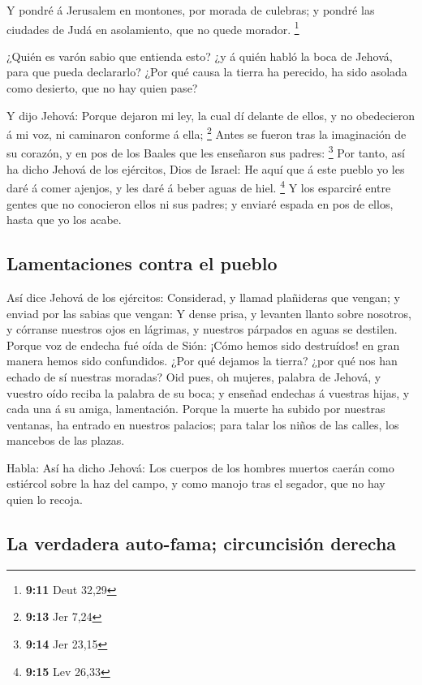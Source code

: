  Y pondré á Jerusalem en montones, por morada de
culebras; y pondré las ciudades de Judá en asolamiento, que no quede
morador. \footnote{\textbf{9:11} Deut 32,29}

 ¿Quién es varón sabio que entienda esto? ¿y á quién
habló la boca de Jehová, para que pueda declararlo? ¿Por qué causa la
tierra ha perecido, ha sido asolada como desierto, que no hay quien
pase?

 Y dijo Jehová: Porque dejaron mi ley, la cual dí delante
de ellos, y no obedecieron á mi voz, ni caminaron conforme á ella;
\footnote{\textbf{9:13} Jer 7,24}  Antes se fueron tras
la imaginación de su corazón, y en pos de los Baales que les enseñaron
sus padres: \footnote{\textbf{9:14} Jer 23,15}  Por
tanto, así ha dicho Jehová de los ejércitos, Dios de Israel: He aquí que
á este pueblo yo les daré á comer ajenjos, y les daré á beber aguas de
hiel. \footnote{\textbf{9:15} Lev 26,33}  Y los esparciré
entre gentes que no conocieron ellos ni sus padres; y enviaré espada en
pos de ellos, hasta que yo los acabe.

\hypertarget{lamentaciones-contra-el-pueblo}{%
\subsection{Lamentaciones contra el
pueblo}\label{lamentaciones-contra-el-pueblo}}

 Así dice Jehová de los ejércitos: Considerad, y llamad
plañideras que vengan; y enviad por las sabias que vengan:
 Y dense prisa, y levanten llanto sobre nosotros, y
córranse nuestros ojos en lágrimas, y nuestros párpados en aguas se
destilen.  Porque voz de endecha fué oída de Sión: ¡Cómo
hemos sido destruídos! en gran manera hemos sido confundidos. ¿Por qué
dejamos la tierra? ¿por qué nos han echado de sí nuestras moradas?
 Oid pues, oh mujeres, palabra de Jehová, y vuestro oído
reciba la palabra de su boca; y enseñad endechas á vuestras hijas, y
cada una á su amiga, lamentación.  Porque la muerte ha
subido por nuestras ventanas, ha entrado en nuestros palacios; para
talar los niños de las calles, los mancebos de las plazas.

 Habla: Así ha dicho Jehová: Los cuerpos de los hombres
muertos caerán como estiércol sobre la haz del campo, y como manojo tras
el segador, que no hay quien lo recoja.

\hypertarget{la-verdadera-auto-fama-circuncisiuxf3n-derecha}{%
\subsection{La verdadera auto-fama; circuncisión
derecha}\label{la-verdadera-auto-fama-circuncisiuxf3n-derecha}}

